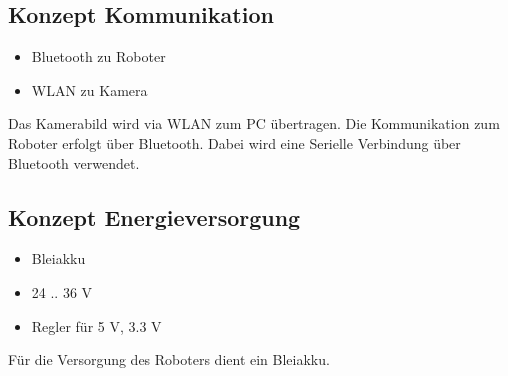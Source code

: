 \subsection{Konzept Kommunikation}
\begin{itemize}
    \item Bluetooth zu Roboter
    \item WLAN zu Kamera
\end{itemize}
Das Kamerabild wird via WLAN zum PC übertragen. Die Kommunikation zum Roboter 
erfolgt über Bluetooth. Dabei wird eine Serielle Verbindung über Bluetooth 
verwendet. 


\subsection{Konzept Energieversorgung}
\begin{itemize}
    \item Bleiakku
    \item 24 .. 36 V
    \item Regler für 5 V, 3.3 V
\end{itemize}
Für die Versorgung des Roboters dient ein Bleiakku. 
